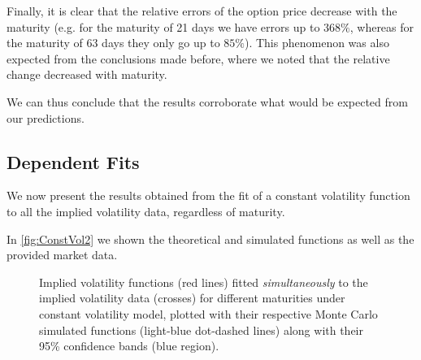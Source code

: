 Finally, it is clear that the relative errors of the option price decrease with the maturity (e.g. for the maturity of 21 days we have errors up to $368\%$, whereas for the maturity of 63 days they only go up to $85\%$). This phenomenon was also expected from the conclusions made before, where we noted that the relative change decreased with maturity.

We can thus conclude that the results corroborate what would be expected from our predictions.

\vspace{\fill}
\newpage

\subsection{Dependent Fits}
We now present the results obtained from the fit of a constant volatility function to all the implied volatility data, regardless of maturity.

In \autoref{fig:ConstVol2} we shown the theoretical and simulated functions as well as the provided market data.
\begin{figure}[H]
  \begin{subfigmatrix}{2}
  \end{subfigmatrix}
  \caption[Implied volatility functions fitted simultaneously to the implied volatility data for different maturities under constant volatility model, plotted with their respective Monte Carlo simulated functions along with their confidence bands.]{Implied volatility functions (red lines) fitted \emph{simultaneously} to the implied volatility data (crosses) for different maturities under constant volatility model, plotted with their respective Monte Carlo simulated functions (light-blue dot-dashed lines) along with their 95\% confidence bands (blue region).}
  \label{fig:ConstVol2}
\end{figure}

